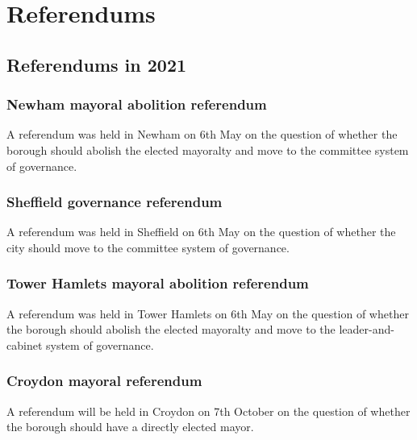 \documentclass[a4paper,openany]{book}
\begin{document}



\part{Referendums}

\chapter{Referendums in 2021}


\section{Newham mayoral abolition referendum}

A referendum was held in Newham on 6th May on the question of whether the borough should abolish the elected mayoralty and move to the committee system of governance.

\section{Sheffield governance referendum}

A referendum was held in Sheffield on 6th May on the question of whether the city should move to the committee system of governance.

\section{Tower Hamlets mayoral abolition referendum}

A referendum was held in Tower Hamlets on 6th May on the question of whether the borough should abolish the elected mayoralty and move to the leader-and-cabinet system of governance.

\section{Croydon mayoral referendum}

A referendum will be  held in Croydon on 7th October on the question of whether the borough should have a directly elected mayor.

\end{document}
